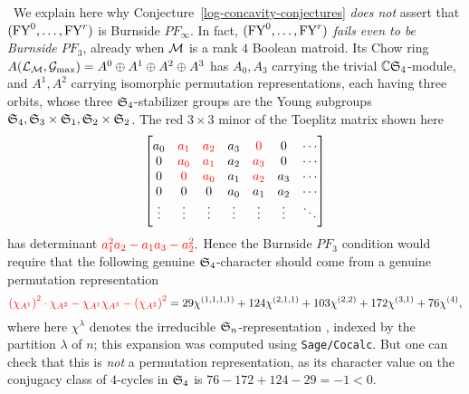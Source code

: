 \begin{example}
\label{Burnside-PF3-counterexample}
 \rm \ 
We explain here why Conjecture~\ref{log-concavity-conjectures} {\it does not} assert that $(\mathrm{FY}^0,\ldots,\mathrm{FY}^r)$ is Burnside $PF_\infty$.  In fact, $(\mathrm{FY}^0,\ldots,\mathrm{FY}^r)$ {\it fails even to be Burnside $PF_3$}, already when $\mathcal{M}$ is a rank $4$ Boolean matroid. Its Chow ring $A(\mathcal{L}_{\mathcal{M}},\mathcal{G}_{\max})=A^0 \oplus A^1 \oplus A^2 \oplus A^3$ has $A_0,A_3$ carrying the trivial $\mathbb{C} \mathfrak{S}_4$-module, and $A^1,A^2$ carrying isomorphic permutation representations, each having three orbits, whose three $\mathfrak{S}_4$-stabilizer groups are the Young subgroups $\mathfrak{S}_4, \mathfrak{S}_3 \times \mathfrak{S}_1, \mathfrak{S}_2 \times \mathfrak{S}_2$.  
The red $3 \times 3$ minor 
of the Toeplitz matrix shown here
$$
\left[
\begin{matrix}
    a_0 & {\color{red}a_1} & {\color{red}a_2} & a_3 & {\color{red} 0} & 0 &\cdots \\
       0  & {\color{red}a_0} & {\color{red}a_1}& a_2 & {\color{red} a_3} & 0 & \cdots \\
       0  &  {\color{red} 0}   & {\color{red} a_0} & a_1 & {\color{red}a_2} & a_3 &\cdots \\
        0  &  0 & 0   &  a_0 & a_1 & a_2  &\cdots \\
  \vdots  &  \vdots   & \vdots & \vdots & \vdots & \vdots & \ddots \\
\end{matrix}
\right]
$$
has determinant 
$
{\color{red}a_1^2 a_2-a_1 a_3 - a_2^2}.
$
Hence the Burnside $PF_3$ condition would require that the following genuine $\mathfrak{S}_4$-character should come from a genuine permutation representation
$$
{\color{red}\left( \chi_{A^1}\right)^2 \cdot \chi_{A^2} - 
\chi_{A^1} \chi_{A^3} - \left(\chi_{A^2}\right)^2
}= 29 \chi^{(1, 1, 1, 1)} + 124 \chi^{(2, 1, 1)} + 
103 \chi^{(2, 2)} + 172 \chi^{(3, 1)} + 76\chi^{(4)},
$$
where here $\chi^\lambda$ denotes the irreducible $\mathfrak{S}_n$-representation \cite{Sagan}, \cite[\S 7.18]{Stanley-EC2} indexed by the partition $\lambda$ of $n$; this expansion was computed using {\tt Sage/Cocalc}.  But one can check that this is {\it not} a permutation representation, as its character value on the conjugacy class of $4$-cycles in $\mathfrak{S}_4$ is $76-172+124-29=-1<0$.
\end{example}


